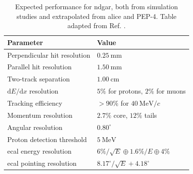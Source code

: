 \begin{table}[t]
	\caption[Expected performance for \gls{ndgar}, both from simulation studies and extrapolated from \gls{alice} and PEP-4.]{Expected performance for \gls{ndgar}, both from simulation studies and extrapolated from \gls{alice} and PEP-4. Table adapted from Ref. \cite{DUNE2021NDCDR}.}
	\begin{center}
		\begin{small}
            \begin{tabular}{l|l}
                Parameter                            & Value                                        \\[2mm] \hline
                \rule{0pt}{1.1\normalbaselineskip}Perpendicular hit resolution         & $0.25~\mathrm{mm}$                           \\[2mm] 
                Parallel hit resolution              & $1.50~\mathrm{mm}$                           \\[2mm] 
                Two-track separation                 & $1.00~\mathrm{cm}$                           \\[2mm] 
                $\mathrm{d}E/\mathrm{d}x$ resolution & $5\%$ for protons, $2\%$ for muons           \\[2mm] 
                Tracking efficiency                  & $>90\%$ for $40 ~ \mathrm{MeV}/c$            \\[2mm] 
                Momentum resolution                  & $2.7\%$ core, $12\%$ tails                   \\[2mm] 
                Angular resolution                   & $0.80^{\circ}$                               \\[2mm] 
                Proton detection threshold           & $5 ~ \mathrm{MeV}$                           \\[2mm] 
                \gls{ecal} energy resolution               & $6\% / \sqrt{E} \oplus 1.6\% / E \oplus 4\%$ \\[2mm] 
                \gls{ecal} pointing resolution             & $8.17^{\circ} / \sqrt{E} + 4.18^{\circ}$    
            \end{tabular}
		\end{small}
	\end{center}
	\label{tab:detector_systs}
\end{table}

